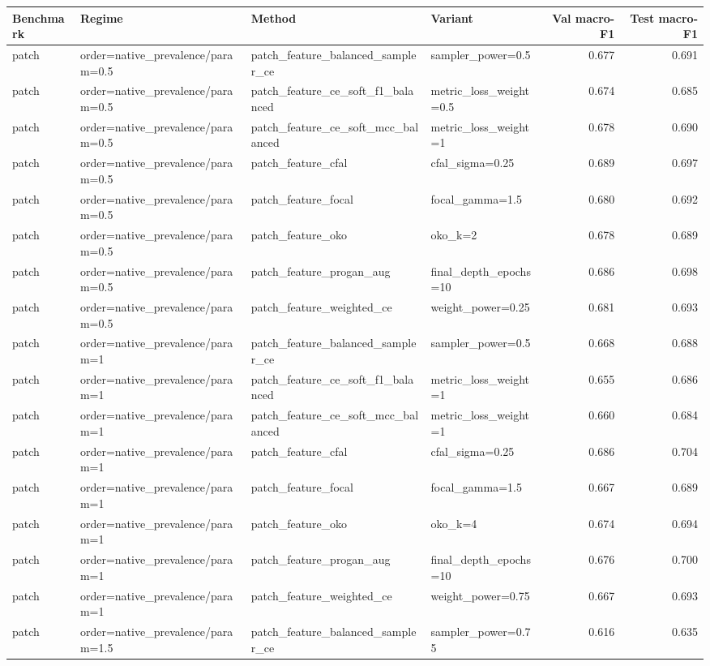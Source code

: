 \begin{tabular}{llllrr}
\toprule
Benchmark & Regime & Method & Variant & Val macro-F1 & Test macro-F1\\
\midrule
patch & order=native_prevalence/param=0.5 & patch_feature_balanced_sampler_ce & sampler_power=0.5 & 0.677 & 0.691\\
patch & order=native_prevalence/param=0.5 & patch_feature_ce_soft_f1_balanced & metric_loss_weight=0.5 & 0.674 & 0.685\\
patch & order=native_prevalence/param=0.5 & patch_feature_ce_soft_mcc_balanced & metric_loss_weight=1 & 0.678 & 0.690\\
patch & order=native_prevalence/param=0.5 & patch_feature_cfal & cfal_sigma=0.25 & 0.689 & 0.697\\
patch & order=native_prevalence/param=0.5 & patch_feature_focal & focal_gamma=1.5 & 0.680 & 0.692\\
patch & order=native_prevalence/param=0.5 & patch_feature_oko & oko_k=2 & 0.678 & 0.689\\
patch & order=native_prevalence/param=0.5 & patch_feature_progan_aug & final_depth_epochs=10 & 0.686 & 0.698\\
patch & order=native_prevalence/param=0.5 & patch_feature_weighted_ce & weight_power=0.25 & 0.681 & 0.693\\
patch & order=native_prevalence/param=1 & patch_feature_balanced_sampler_ce & sampler_power=0.5 & 0.668 & 0.688\\
patch & order=native_prevalence/param=1 & patch_feature_ce_soft_f1_balanced & metric_loss_weight=1 & 0.655 & 0.686\\
patch & order=native_prevalence/param=1 & patch_feature_ce_soft_mcc_balanced & metric_loss_weight=1 & 0.660 & 0.684\\
patch & order=native_prevalence/param=1 & patch_feature_cfal & cfal_sigma=0.25 & 0.686 & 0.704\\
patch & order=native_prevalence/param=1 & patch_feature_focal & focal_gamma=1.5 & 0.667 & 0.689\\
patch & order=native_prevalence/param=1 & patch_feature_oko & oko_k=4 & 0.674 & 0.694\\
patch & order=native_prevalence/param=1 & patch_feature_progan_aug & final_depth_epochs=10 & 0.676 & 0.700\\
patch & order=native_prevalence/param=1 & patch_feature_weighted_ce & weight_power=0.75 & 0.667 & 0.693\\
patch & order=native_prevalence/param=1.5 & patch_feature_balanced_sampler_ce & sampler_power=0.75 & 0.616 & 0.635\\

\end{tabular}
